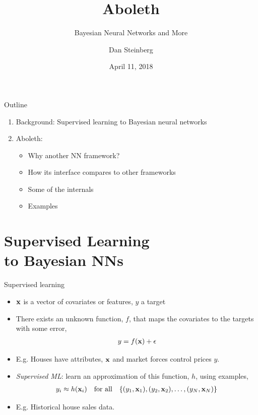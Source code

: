 \documentclass[lualatex, aspectratio=169]{beamer}
\title{Aboleth}
\subtitle{Bayesian Neural Networks and More}
\author{Dan Steinberg}
\date{April 11, 2018}
\institute{Inference Systems Engineering}
\begin{document}
\maketitle

\begin{frame}{Outline}
  \begin{enumerate}
    \item Background: Supervised learning to Bayesian neural networks
    \item Aboleth:
    \begin{itemize}
      \item{Why another NN framework?}
      \item{How its interface compares to other frameworks}
      \item{Some of the internals}
      \item{Examples}
    \end{itemize}
  \end{enumerate}
\end{frame}


\section{Supervised Learning \\ to Bayesian NNs}


\begin{frame}{Supervised learning}
  \begin{itemize}
    \item <1-> $\mathbf{x}$ is a vector of covariates or features, $y$ a target 
    \item <2-> There exists an unknown function, $f$, that maps the covariates to the targets with some error,
      \begin{align*}
        y = f(\mathbf{x}) + \epsilon
      \end{align*}
    \item <3> E.g. Houses have attributes, $\mathbf{x}$ and market forces control prices $y$. 
    \item <4-> \emph{Supervised ML}: learn an approximation of this function, $h$, using examples,
      \begin{align*}
        y_i \approx h(\mathbf{x}_i) \quad \text{for all} \quad \{(y_1, \mathbf{x}_1), (y_2, \mathbf{x}_2), \ldots,
          (y_N, \mathbf{x}_N) \}
      \end{align*}
    \item <5> E.g. Historical house sales data.
  \end{itemize}
\end{frame}
\end{document}

